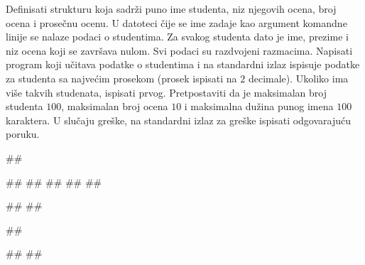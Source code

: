 \begin{Exercise}[label=p3_x3]         
Definisati strukturu  koja sadrži puno ime studenta, niz njegovih ocena, broj ocena i 
prosečnu ocenu.
U datoteci čije se ime zadaje kao argument komandne linije se nalaze podaci o studentima. 
Za svakog studenta dato je ime, prezime i niz ocena koji se završava nulom. 
Svi podaci su razdvojeni razmacima. Napisati program koji učitava podatke o studentima i
na standardni izlaz ispisuje podatke za studenta sa najvećim prosekom (prosek ispisati na $2$ decimale).
Ukoliko ima više takvih studenata, ispisati prvog.
Pretpostaviti da je maksimalan broj studenta $100$, maksimalan broj ocena $10$ i
maksimalna dužina punog imena $100$ karaktera. 
U slučaju greške, na standardni izlaz za greške ispisati odgovarajuću poruku.

\begin{miditest}
\begin{upotreba}{1}
##

##
##
##
##
##

#\naslovIzlaz#
##
\end{upotreba}
\end{miditest}
\begin{miditest}
\begin{upotreba}{2}
##

#\naslovIzlazZaGresku#
##
\end{upotreba}
\end{miditest}
\end{Exercise}
\begin{Answer}[ref=p3_x3]
\end{Answer}


